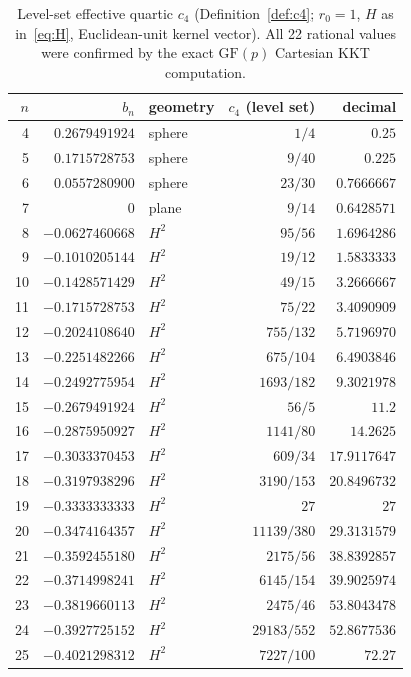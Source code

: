 \documentclass[11pt]{article}
\theoremstyle{definition}
\theoremstyle{remark}
\begin{document}
\begin{table}[h]
\centering\small
\begin{tabular}{rrlrr}
\toprule
$n$ & $b_n$ & geometry & $c_4$ (level set) & decimal\\
\midrule
4 & $0.2679491924$ & sphere & $1/4$ & $0.25$\\
5 & $0.1715728753$ & sphere & $9/40$ & $0.225$\\
6 & $0.0557280900$ & sphere & $23/30$ & $0.7666667$\\
7 & $0$ & plane & $9/14$ & $0.6428571$\\
8 & $-0.0627460668$ & $H^2$ & $95/56$ & $1.6964286$\\
9 & $-0.1010205144$ & $H^2$ & $19/12$ & $1.5833333$\\
10 & $-0.1428571429$ & $H^2$ & $49/15$ & $3.2666667$\\
11 & $-0.1715728753$ & $H^2$ & $75/22$ & $3.4090909$\\
12 & $-0.2024108640$ & $H^2$ & $755/132$ & $5.7196970$\\
13 & $-0.2251482266$ & $H^2$ & $675/104$ & $6.4903846$\\
14 & $-0.2492775954$ & $H^2$ & $1693/182$ & $9.3021978$\\
15 & $-0.2679491924$ & $H^2$ & $56/5$ & $11.2$\\
16 & $-0.2875950927$ & $H^2$ & $1141/80$ & $14.2625$\\
17 & $-0.3033370453$ & $H^2$ & $609/34$ & $17.9117647$\\
18 & $-0.3197938296$ & $H^2$ & $3190/153$ & $20.8496732$\\
19 & $-0.3333333333$ & $H^2$ & $27$ & $27$\\
20 & $-0.3474164357$ & $H^2$ & $11139/380$ & $29.3131579$\\
21 & $-0.3592455180$ & $H^2$ & $2175/56$ & $38.8392857$\\
22 & $-0.3714998241$ & $H^2$ & $6145/154$ & $39.9025974$\\
23 & $-0.3819660113$ & $H^2$ & $2475/46$ & $53.8043478$\\
24 & $-0.3927725152$ & $H^2$ & $29183/552$ & $52.8677536$\\
25 & $-0.4021298312$ & $H^2$ & $7227/100$ & $72.27$\\
\bottomrule
\end{tabular}
\caption{Level-set effective quartic $c_4$ (Definition~\ref{def:c4}; $r_0=1$, $H$ as in~\eqref{eq:H},
Euclidean-unit kernel vector). All 22 rational values were confirmed by the exact $\mathrm{GF}(p)$
Cartesian KKT computation.}
\label{tab:c4}
\end{table}
\end{document}
